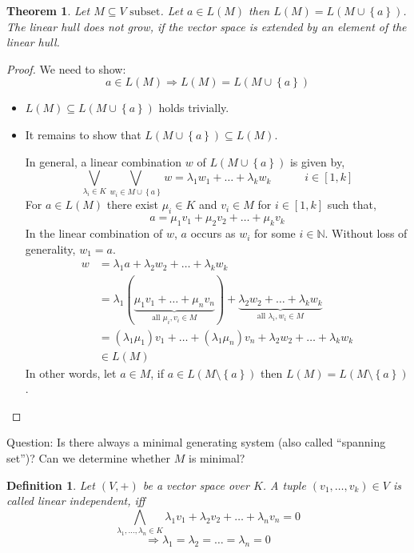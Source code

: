 \documentclass[a4paper,landscape,twocolumn]{article}
\newcommand\set[1]{\left\{#1\right\}}
\newtheorem{theorem}{Theorem}
\newtheorem{defi}{Definition}
\begin{document}
\begin{theorem}
  \label{satz-3.15}
  Let $M \subseteq V \text{ subset}$.
  Let $a \in L(M)$ then $L(M) = L(M \cup \set{a})$.
  The linear hull does not grow, if the vector space is extended by an element of the linear hull.
\end{theorem}
\begin{proof}
  We need to show:
  \[ a \in L(M) \Rightarrow L(M) = L(M \cup \set{a}) \]
  \begin{itemize}
    \item $L(M) \subseteq L(M \cup \set{a})$ holds trivially.
    \item
      It remains to show that $L(M \cup \set{a}) \subseteq L(M)$.

      In general, a linear combination $w$ of $L(M \cup \set{a})$ is given by,
      \[
        \bigvee_{\lambda_i \in K} \bigvee_{w_i \in M \cup \set{a}}
        w = \lambda_1 w_1 + \ldots + \lambda_k w_k
        \quad\qquad i \in [1, k]
      \]
      For $a \in L(M)$ there exist $\mu_i \in K$ and $v_i \in M$ for $i \in [1, k]$ such that,
      \[ a = \mu_1 v_1 + \mu_2 v_2 + \ldots + \mu_k v_k \]
      In the linear combination of $w$, $a$ occurs as $w_i$ for some $i \in \mathbb N$.
      Without loss of generality, $w_1 = a$.
      \begin{align*}
        w &= \lambda_1 a + \lambda_2 w_2 + \ldots + \lambda_k w_k \\
          &= \lambda_1(\underbrace{\mu_1 v_1 + \ldots + \mu_n v_n}_{\text{all } \mu_i, v_i \in M})
          + \underbrace{\lambda_2 w_2 + \ldots + \lambda_k w_k}_{\text{all } \lambda_i, w_i \in M} \\
          &= (\lambda_1 \mu_1) v_1 + \ldots + (\lambda_1 \mu_n) v_n
          + \lambda_2 w_2 + \ldots + \lambda_k w_k \\
          &\in L(M)
      \end{align*}
    In other words, let $a \in M$, if $a \in L(M \setminus \set{a})$ then $L(M) = L(M \setminus \set{a})$.
  \end{itemize}
\end{proof}

\begin{center}
  Question:
  Is there always a minimal generating system (also called \enquote{spanning set})?
  Can we determine whether $M$ is minimal?
\end{center}

\begin{defi}
  Let $(V, +)$ be a vector space over $K$.
  A tuple $(v_1, \ldots, v_k) \in V$ is called linear independent, iff
  \[ \bigwedge_{\lambda_1, \ldots, \lambda_n \in K} {\lambda}_1 v_1 + \lambda_2 v_2 + \ldots + \lambda_n v_n = 0 \]
  \[ \Rightarrow \lambda_1 = \lambda_2 = \ldots = \lambda_n = 0 \]
\end{defi}
\end{document}
